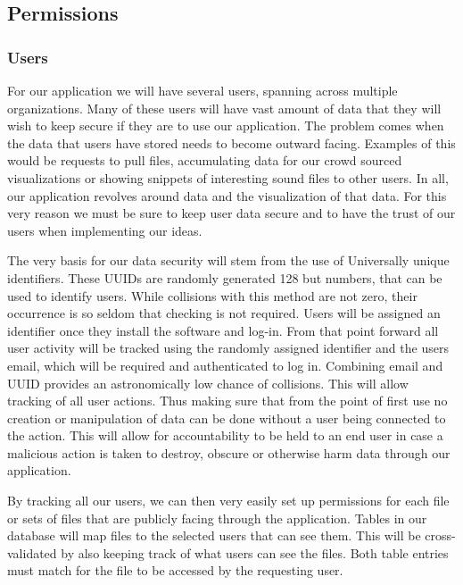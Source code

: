 \subsection{Permissions}

\subsubsection{Users}
For our application we will have several users, spanning across multiple organizations. Many of these users will have vast amount of data that they will wish to keep secure if they are to use our application. The problem comes when the data that users have stored needs to become outward facing. Examples of this would be requests to pull files, accumulating data for our crowd sourced visualizations or showing snippets of interesting sound files to other users. In all, our application revolves around data and the visualization of that data. For this very reason we must be sure to keep user data secure and to have the trust of our users when implementing our ideas.\par
The very basis for our data security will stem from the use of Universally unique identifiers. These UUID\textquotesingle s are randomly generated 128 but numbers, that can be used to identify users. While collisions with this method are not zero, their occurrence is so seldom that checking is not required. Users will be assigned an identifier once they install the software and log-in. From that point forward all user activity will be tracked using the randomly assigned identifier and the user\textquotesingle s email, which will be required and authenticated to log in. Combining email and UUID provides an astronomically low chance of collisions. This will allow tracking of all user actions. Thus making sure that from the point of first use no creation or manipulation of data can be done without a user being connected to the action. This will allow for accountability to be held to an end user in case a malicious action is taken to destroy, obscure or otherwise harm data through our application.\par
By tracking all our users, we can then very easily set up permissions for each file or sets of files that are publicly facing through the application. Tables in our database will map files to the selected users that can see them. This will be cross-validated by also keeping track of what users can see the files. Both table entries must match for the file to be accessed by the requesting user.

